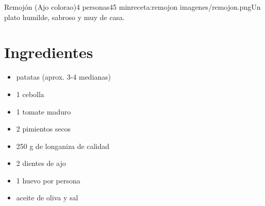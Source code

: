 \begin{recetaConImagen}{Remojón (Ajo colorao)}{4 personas}{45 min}{receta:remojon}
    {imagenes/remojon.png}{Un plato humilde, sabroso y muy de casa.}

    
    \begin{minipage}[t]{0.35\textwidth}
        \small
        \section*{Ingredientes}
        \begin{itemize}[leftmargin=*, itemsep=1pt, topsep=2pt]
            \item patatas (aprox. 3-4 medianas)
            \item 1 cebolla
            \item 1 tomate maduro
            \item 2 pimientos secos
            \item 250 g de longaniza de calidad
            \item 2 dientes de ajo
            \item 1 huevo por persona
            \item aceite de oliva y sal
        \end{itemize}
    \end{minipage}
    \hfill
    \begin{minipage}[t]{0.6\textwidth}
        \small

\end{minipage}
\end{recetaConImagen}
